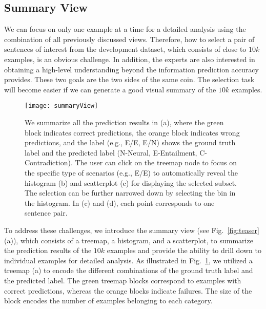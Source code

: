 

\subsection{Summary View}
\label{sec:allPairs}
We can focus on only one example at a time for a detailed analysis using the combination of all previously discussed views. Therefore, how to select a pair of sentences of interest from the development dataset, which consists of close to $10k$ examples, is an obvious challenge.
In addition, the experts are also interested in obtaining a high-level understanding beyond the information prediction accuracy provides.%
%
These two goals are the two sides of the same coin. 
The selection task will become easier if we can generate a good visual summary of the $10k$ examples.%

\begin{figure}[htbp]
\centering
\vspace{-2mm}
 \texttt{[image: summaryView]}
 \vspace{-6mm}
 \caption{
We summarize all the prediction results in (a), where the green block indicates correct predictions, the orange block indicates wrong predictions, and the label (e.g., E/E, E/N) shows the ground truth label and the predicted label (N-Neural, E-Entailment, C-Contradiction).
%
The user can click on the treemap node to focus on the specific type of scenarios (e.g., E/E) to automatically reveal the histogram (b) and scatterplot (c) for displaying the selected subset.
The selection can be further narrowed down by selecting the bin in the histogram.
In (c) and (d), each point corresponds to one sentence pair.
 }
 \vspace{-2mm}
\label{fig:summaryView}
\end{figure}

To address these challenges, we introduce the summary view (see Fig.~\ref{fig:teaser}(a)), which consists of a treemap, a histogram, and a scatterplot, to summarize the prediction results of the $10k$ examples and provide the ability to drill down to individual examples for detailed analysis.
As illustrated in Fig.~\ref{fig:summaryView}, we utilized a treemap (a) to encode the different combinations of the ground truth label and the predicted label. The green treemap blocks correspond to examples with correct predictions, whereas the orange blocks indicate failures. The size of the block encodes the number of examples belonging to each category.

